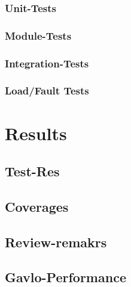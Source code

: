 		\subsection{Unit-Tests}
		\subsection{Module-Tests}
		\subsection{Integration-Tests}
		\subsection{Load/Fault Tests}
		
	
\chapter{Results}
\label{cha:Results}
	\section{Test-Res}
	\section{Coverages}
	\section{Review-remakrs}
	\section{Gavlo-Performance}
	

